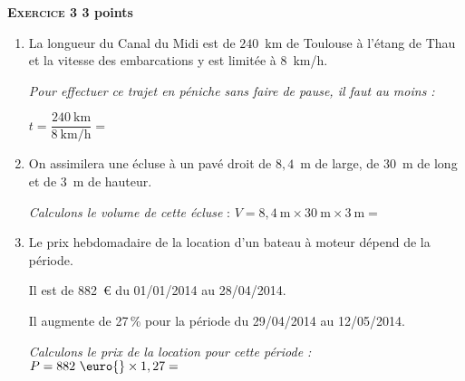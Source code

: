 \textbf{\textsc{Exercice 3} \hfill 3 points}

\medskip
 
\begin{enumerate}
\item La longueur du Canal du Midi est de $240$~km de Toulouse à l'étang de Thau et la vitesse des embarcations y est limitée à $8$~km/h. 

\textit{Pour effectuer ce trajet en péniche sans faire de pause, il faut au moins :}

$t=\dfrac{240~\text{km}}{8~\text{km/h}}=$
\item On assimilera une écluse à un pavé droit de $8,4$~m de large, de $30$~m de long et de $3$~m de hauteur. 

\textit{Calculons le volume de cette écluse }: $V=8,4~\text{m}\times 30~\text{m}\times 3~\text{m}=$
\item Le prix hebdomadaire de la location d'un bateau à moteur dépend de la période.
 
Il est de 882~\euro{} du 01/01/2014 au 28/04/2014.
 
Il augmente de 27\,\% pour la période du 29/04/2014 au 12/05/2014.
 
\textit{Calculons le prix de la location pour cette période :} $P=882\text{~\euro{}} \times 1,27=$
\end{enumerate}
 
\vspace{0,5cm}

